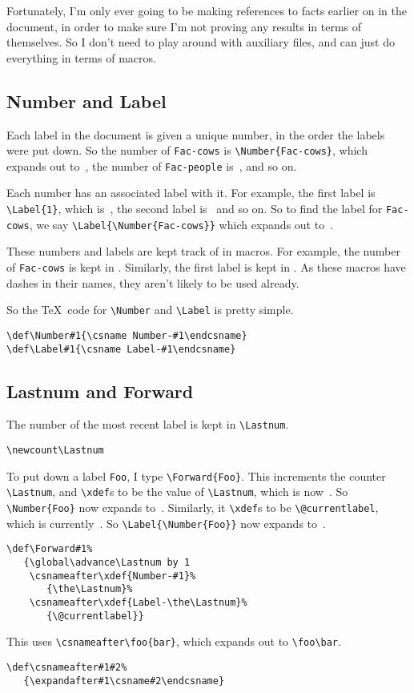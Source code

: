 Fortunately, I'm only ever going to be making references to facts
earlier on in the document, in order to make sure I'm not proving
any results in terms of themselves.  So I don't need to play around
with auxiliary files, and can just do everything in terms of
macros.

\subsection{Number and Label}

Each label in the document is given a unique number, in the order
the labels were put down.  So the number of \verb|Fac-cows| 
is \verb|\Number{Fac-cows}|, which expands out to~,
the number of \verb|Fac-people| is~, and so on.

Each number has an associated label with it.  For example,
the first label is \verb|\Label{1}|, which is~,
the second label is~ and so on.  So to find the label for
\verb|Fac-cows|, we say \verb|\Label{\Number{Fac-cows}}| which expands 
out to~.

These numbers and labels are kept track of in macros.  For example,
the number of \verb|Fac-cows| is kept in .
Similarly, the first label is kept in .
As these macros have dashes in their names, they aren't likely to
be used already.

So the \TeX\ code for \verb|\Number| and \verb|\Label| is pretty
simple.
\begin{verbatim}
\def\Number#1{\csname Number-#1\endcsname}
\def\Label#1{\csname Label-#1\endcsname}
\end{verbatim}

\subsection{Lastnum and Forward}

The number of the most recent label is kept in \verb|\Lastnum|.
\begin{verbatim}
\newcount\Lastnum
\end{verbatim}
To put down a label \verb|Foo|, I type \verb|\Forward{Foo}|.
This increments the counter
\verb|\Lastnum|, and \verb|\xdef|s 
to be the value of
\verb|\Lastnum|, which is now~\the\Lastnum.  So
\verb|\Number{Foo}| now expands to~.
Similarly, it \verb|\xdef|s  to be
\verb|\@currentlabel|, which is currently~.
So \verb|\Label{\Number{Foo}}| now expands to~.
\begin{verbatim}
\def\Forward#1%
   {\global\advance\Lastnum by 1
    \csnameafter\xdef{Number-#1}%
       {\the\Lastnum}%
    \csnameafter\xdef{Label-\the\Lastnum}%
       {\@currentlabel}}
\end{verbatim}
This uses \verb|\csnameafter\foo{bar}|, which expands out to
\verb|\foo\bar|.
\begin{verbatim}
\def\csnameafter#1#2%
   {\expandafter#1\csname#2\endcsname}
\end{verbatim}

